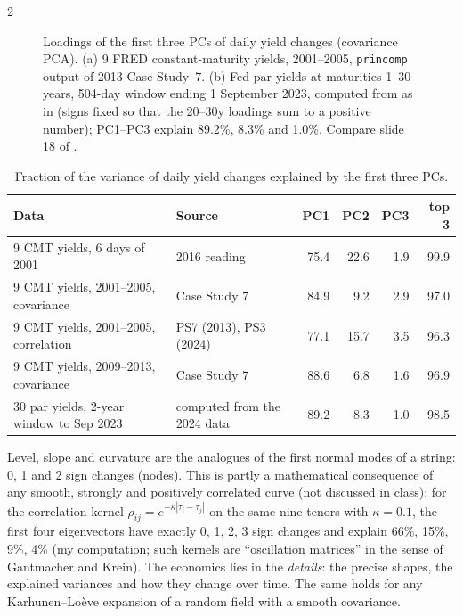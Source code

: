 \begin{paracol}{2}
\begin{figure}[ht]
\caption{Loadings of the first three PCs of daily yield changes (covariance PCA). (a) 9 FRED constant-maturity
yields, 2001--2005, \texttt{princomp} output of 2013 Case Study~7. (b) Fed par yields at maturities 1--30 years,
504-day window ending 1 September 2023, computed from  as in
 (signs fixed so that the 20--30y loadings sum to a positive number); PC1--PC3
explain 89.2\%, 8.3\% and 1.0\%. Compare slide 18 of .}\label{ch07:fig-loadings}
\end{figure}

\begin{table}[ht]
\centering\small
\caption{Fraction of the variance of daily yield changes explained by the first three PCs.}\label{ch07:tab-share}
\setlength{\tabcolsep}{3pt}\begin{tabular}{@{}l l rrrr@{}}
\toprule
Data & Source & PC1 & PC2 & PC3 & top 3\\
\midrule
9 CMT yields, 6 days of 2001 & 2016 reading & 75.4 & 22.6 & 1.9 & 99.9\\
9 CMT yields, 2001--2005, covariance & Case Study 7 & 84.9 & 9.2 & 2.9 & 97.0\\
9 CMT yields, 2001--2005, correlation & PS7 (2013), PS3 (2024) & 77.1 & 15.7 & 3.5 & 96.3\\
9 CMT yields, 2009--2013, covariance & Case Study 7 & 88.6 & 6.8 & 1.6 & 96.9\\
30 par yields, 2-year window to Sep 2023 & computed from the 2024 data & 89.2 & 8.3 & 1.0 & 98.5\\
\bottomrule
\end{tabular}
\end{table}

\begin{intuition}
Level, slope and curvature are the analogues of the first normal modes of a string: 0, 1 and 2 sign changes
(nodes). This is partly a mathematical consequence of any smooth, strongly and positively correlated
curve (not discussed in class): for the correlation kernel $\rho_{ij}=e^{-\kappa|\tau_i-\tau_j|}$ on the same nine
tenors with $\kappa=0.1$, the first four eigenvectors have exactly 0, 1, 2, 3 sign changes and explain
66\%, 15\%, 9\%, 4\% (my computation; such kernels are ``oscillation matrices'' in the sense of
Gantmacher and Krein). The economics lies in the \emph{details}: the precise shapes, the explained
variances and how they change over time. The same holds for any Karhunen--Lo\`eve expansion of a random
field with a smooth covariance.
\end{intuition}


\end{paracol}
